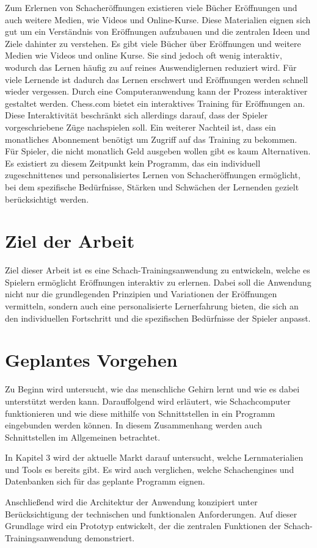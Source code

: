 Zum Erlernen von Schacheröffnungen existieren viele Bücher Eröffnungen und auch weitere Medien, wie Videos und Online-Kurse. Diese Materialien eignen sich gut um ein Verständnis von Eröffnungen aufzubauen und die zentralen Ideen und Ziele dahinter zu verstehen.
Es gibt viele Bücher über Eröffnungen und weitere Medien wie Videos und online Kurse. Sie sind jedoch oft wenig interaktiv, wodurch das Lernen häufig zu auf reines Auswendiglernen reduziert wird. Für viele Lernende ist dadurch das Lernen erschwert  und Eröffnungen werden schnell wieder vergessen. Durch eine Computeranwendung kann der Prozess interaktiver gestaltet werden. Chess.com bietet ein interaktives Training für Eröffnungen an. Diese Interaktivität beschränkt sich allerdings darauf, dass der Spieler vorgeschriebene Züge nachspielen soll. Ein weiterer Nachteil ist, dass ein monatliches Abonnement benötigt um Zugriff auf das Training zu bekommen. Für Spieler, die nicht monatlich Geld ausgeben wollen gibt es kaum Alternativen.
Es existiert zu diesem Zeitpunkt kein Programm, das ein individuell zugeschnittenes und personalisiertes Lernen von Schacheröffnungen ermöglicht, bei dem spezifische Bedürfnisse, Stärken und Schwächen der Lernenden gezielt berücksichtigt werden.

\section{Ziel der Arbeit}
Ziel dieser Arbeit ist es eine Schach-Trainingsanwendung zu entwickeln, welche es Spielern ermöglicht Eröffnungen interaktiv zu erlernen. Dabei soll die Anwendung nicht nur die grundlegenden Prinzipien und Variationen der Eröffnungen vermitteln, sondern auch eine personalisierte Lernerfahrung bieten, die sich an den individuellen Fortschritt und die spezifischen Bedürfnisse der Spieler anpasst.

\section{Geplantes Vorgehen}
Zu Beginn wird untersucht, wie das menschliche Gehirn lernt und wie es dabei unterstützt werden kann. Darauffolgend wird erläutert, wie Schachcomputer funktionieren und wie diese mithilfe von Schnittstellen in ein Programm eingebunden werden können. In diesem Zusammenhang werden auch Schnittstellen im Allgemeinen betrachtet.

In Kapitel 3 wird der aktuelle Markt darauf untersucht, welche Lernmaterialien und Tools es bereits gibt. Es wird auch verglichen, welche Schachengines und Datenbanken sich für das geplante Programm eignen.

Anschließend wird die Architektur der Anwendung konzipiert unter Berücksichtigung der technischen und funktionalen Anforderungen. Auf dieser Grundlage wird ein Prototyp entwickelt, der die zentralen Funktionen der Schach-Trainingsanwendung demonstriert.
